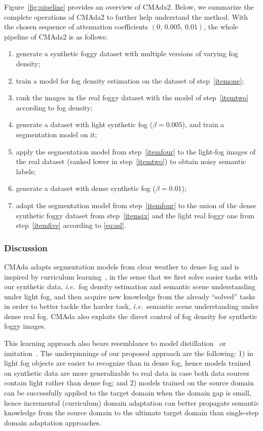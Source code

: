\documentclass[twocolumn]{svjour3}          \smartqed  \usepackage{graphicx}
\newcommand{\ie}{\mbox{\emph{i.e.\ }}}
\begin{document}
Figure~\ref{fig:pipeline} provides an overview of CMAda2. Below, we summarize the complete operations of CMAda2 to further help understand the method.
With the chosen sequence of attenuation coefficients $(0,\,0.005,\,0.01)$, the whole pipeline of CMAda2 is as follows: 
\begin{enumerate}
    \item generate a synthetic foggy dataset with multiple versions of varying fog density; \label{itemone}
    \item train a model for fog density estimation on the dataset of step~\ref{itemone}; \label{itemtwo}
    \item rank the images in the real foggy dataset with the model of step~\ref{itemtwo} according to fog density; \label{itemthree}
    \item generate a dataset with light synthetic fog ($\beta=0.005$), and train a segmentation model on it; \label{itemfour}
    \item apply the segmentation model from step~\ref{itemfour} to the light-fog images of the real dataset (ranked lower in step~\ref{itemtwo}) to obtain noisy semantic labels; \label{itemfive}
    \item generate a dataset with dense synthetic fog ($\beta=0.01$); \label{itemsix}
    \item adapt the segmentation model from step~\ref{itemfour} to the union of the dense synthetic foggy dataset from step~\ref{itemsix} and the light real foggy one from step~\ref{itemfive} according to \eqref{eq:ssl}. \label{itemseven}
\end{enumerate}

\subsubsection{Discussion}

CMAda adapts segmentation models from clear weather to dense fog and is inspired by curriculum learning~\cite{curriculum:learning}, in the sense that we first solve easier tasks with our synthetic data, \ie{}fog density estimation and semantic scene understanding under light fog, and then acquire new knowledge from the already ``solved'' tasks in order to better tackle the harder task, \ie{}semantic scene understanding under dense real fog. CMAda also exploits the direct control of fog density for synthetic foggy images.  

This learning approach also bears resemblance to model distillation~\cite{hinton2015distilling,supervision:transfer} or imitation~\cite{model:compression,dai:metric:imitation}. The underpinnings of our proposed approach are the following: 1) in light fog objects are easier to recognize than in dense fog, hence models trained on synthetic data are more generalizable to real data in case both data sources contain light rather than dense fog; and 2) models trained on the source domain can be successfully applied to the target domain when the domain gap is small, hence incremental (curriculum) domain adaptation can better propagate semantic knowledge from the source domain to the ultimate target domain than single-step domain adaptation approaches. 
\end{document}

